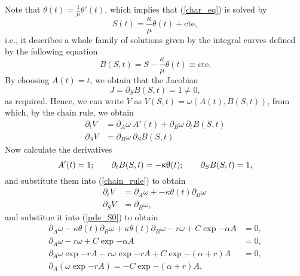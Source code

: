 Note that $\theta(t) = \frac{1}{\mu}\theta'(t)$, which implies that (\ref{char_eq}) is solved by
\begin{equation}
	S(t) = \frac{\kappa}{\mu} \theta(t) + \text{cte},
\end{equation}
i.e., it describes a whole family of solutions given by the integral curves defined by the following equation
\begin{equation}\label{integral_curves}
	B(S,t) = S - \frac{\kappa}{\mu} \theta(t) \equiv \text{cte}.
\end{equation}
By choosing $A(t) = t$, we obtain that the Jacobian 
\begin{equation}
	J = \partial_S B(S, t)  = 1 \not = 0,
\end{equation}
as required. Hence, we can write $V$ as $V(S,t) = \omega(A(t), B(S,t))$, from which, by the chain rule, we obtain
\begin{equation}\label{chain_rule}
	\begin{aligned}
		\partial_t V& = \partial_A \omega \ A'(t) + \partial_B \omega \ \partial_t  B(S,t)\\
		\partial_S V& = \partial_B \omega \ \partial_S B(S,t)
	\end{aligned}
\end{equation}
Now calculate the derivatives
\begin{equation}
	A'(t) = 1; \quad\quad  \partial_tB (S,t) = -\upkappa \uptheta(t); \quad\quad \partial_SB(S,t) = 1,
\end{equation}
and substitute them into (\ref{chain_rule}) to obtain
\begin{equation}
	\begin{aligned}
		\partial_t V& = \partial_A \omega +  -\kappa\theta(t)\partial_B \omega \ \\
		\partial_S V& = \partial_B \omega, 
	\end{aligned}
\end{equation}
and substitue it into (\ref{pde_S0}) to obtain
$$
\begin{aligned}
	\partial_A \omega   -\kappa\theta(t)\partial_B \omega + \kappa \theta(t) \partial_B \omega - r \omega + C \exp{-\alpha A} &= 0,	\\
	\partial_A \omega  - r \omega + C \exp{-\alpha A} &= 0,\\
	\partial_A \omega \exp{-rA}  - r \omega \exp{-rA} + C \exp{-(\alpha+r) A} &= 0,\\
	\partial_A\left(\omega \exp{-rA}\right) = -C \exp{-(\alpha+r)A},
\end{aligned}
$$
